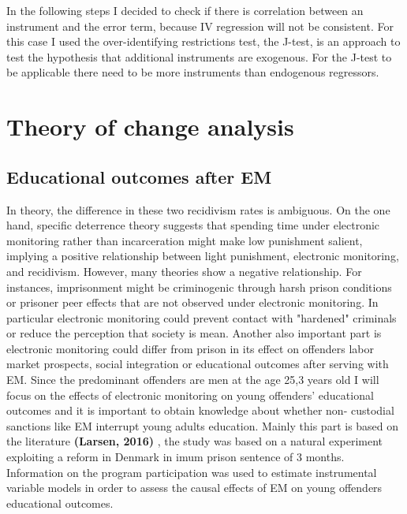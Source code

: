 \documentclass[a4paper,12pt]{article}
\begin{document}
In the following steps I decided to check if there is correlation between an instrument and the error term, because  IV regression will not be consistent.  For this case I used the over-identifying restrictions test, the J-test, is an approach to test the hypothesis that additional instruments are exogenous. For the J-test to be applicable there need to be more instruments than endogenous regressors.

\newpage
\section{Theory of change analysis}
\subsection{Educational outcomes after EM}
In theory, the difference in these two recidivism rates is ambiguous. On the one hand, specific deterrence theory suggests that spending time under electronic monitoring rather than incarceration might make low punishment salient, implying a positive relationship between light punishment, electronic monitoring, and recidivism. However, many theories show a negative relationship. For instances, imprisonment might be criminogenic through harsh prison conditions or prisoner peer effects that are not observed under electronic monitoring. In particular electronic monitoring could prevent contact with "hardened" criminals or reduce the perception that society is mean. Another also important part is electronic monitoring could differ from prison in its effect on offenders labor market prospects, social integration or educational outcomes after serving with EM. Since the predominant offenders are men at the age 25,3 years old I will focus on the effects of electronic monitoring on young offenders' educational outcomes and it is important to obtain knowledge about whether non- custodial sanctions like EM interrupt young adults education. Mainly this part is based on the literature \textbf{(Larsen, 2016)} \cite{Larsen2017}, the study was based on a natural experiment exploiting a reform in Denmark in imum prison sentence of 3 months. Information on the program participation was used to estimate instrumental variable models in order to assess the causal effects of EM on young offenders educational outcomes. 
\end{document}
